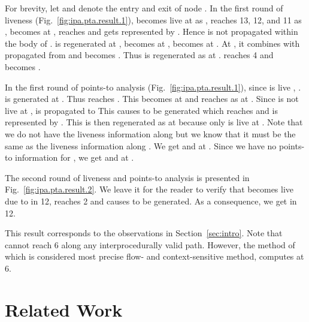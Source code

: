 \documentclass{llncs}
\newcommand{\pt}[2]{\text{}}
\newcommand{\dfvl}[2]{\text{}}
\newcommand{\dfva}[2]{\text{}}
\begin{document}
{

For brevity, let  and  denote the entry and exit of node .
In the first round of liveness (Fig.~\ref{fig:ipa.pta.result.1}),
        becomes live at  as \dfvl{\lambda}{z}, reaches 13, 12,
	and 11 as \dfvl{c_1}{z}, becomes \dfvl{c_1c_2}{z} at , reaches 
	and gets represented by \dfvl{c_1}{z}. Hence 
	\dfvl{c_1c_2}{z} is not propagated within the body of .
        \dfvl{c_1c_2}{z} is regenerated at , becomes \dfvl{c_1}{z} at ,
	becomes \dfvl{c_1}{w} at . At , it combines with \dfvl{c_1}{z}
	propagated from  and becomes \dfvl{c_1}{w\;z}. Thus  is
	regenerated as \dfvl{c_1c_2}{w\;z} at .
        \dfvl{c_1}{w\;z} reaches 4 and becomes \dfvl{\lambda}{w\;z}. 

In the first round of points-to analysis (Fig.~\ref{fig:ipa.pta.result.1}),
	since  is live , \text{}.
	\dfva{\lambda}{\pt{w}{x}} is generated at . Thus 
	\dfva{c_1}{\pt{w}{x}, \pt{z}{?}} reaches . 
        This becomes
	\dfva{c_1}{\pt{w}{x}, \pt{z}{x}} at  and reaches as 
	\dfva{c_1c_2}{\pt{w}{x}, \pt{z}{x}} at . 
	Since  is not live at , \dfva{c_1c_2}{\pt{w}{x}} is propagated to  
	This causes
	\dfva{c_1c_2c_2}{\pt{w}{x}, \pt{z}{x}} to be generated  which reaches
	 and is represented by  \dfva{c_1c_2}{\pt{w}{x}, \pt{z}{x}}. 
	This is then regenerated as  \dfva{c_1c_2c_2}{\pt{z}{x}} at  because only
	 is live at . Note that we do not have the liveness information
	along  but we know that it must be the same as the liveness information
	along .
	We get \dfva{c_1c_2}{\pt{z}{x}} and \dfva{c_1}{\pt{z}{x}} at . Since we have
	no points-to information for , we get  
	\dfva{c_1c_2}{\emptyset} and \dfva{c_1}{\emptyset} at .

The second round of liveness and points-to analysis is presented in 
	Fig.~\ref{fig:ipa.pta.result.2}. We leave it for the reader to verify that
	 becomes live due to \text{} in 12, reaches 2 and causes \dfva{\lambda}{x}{y}
	to be generated. As a consequence, we get \pt{z}{y} in 12. 

This result corresponds to the observations in Section~\ref{sec:intro}.
	Note that \pt{z}{x}
	cannot reach 6 along any interprocedurally valid path. However, 
        the method of~\cite{Emami.M.Ghiya.R.Hendren.LJ:1994:Context-sensitive-interprocedural-points-to}
        which is considered most precise flow- and context-sensitive method, computes \pt{z}{x}
	at 6.

}


\section{Related Work}
\label{sec:related.work}
\end{document}
